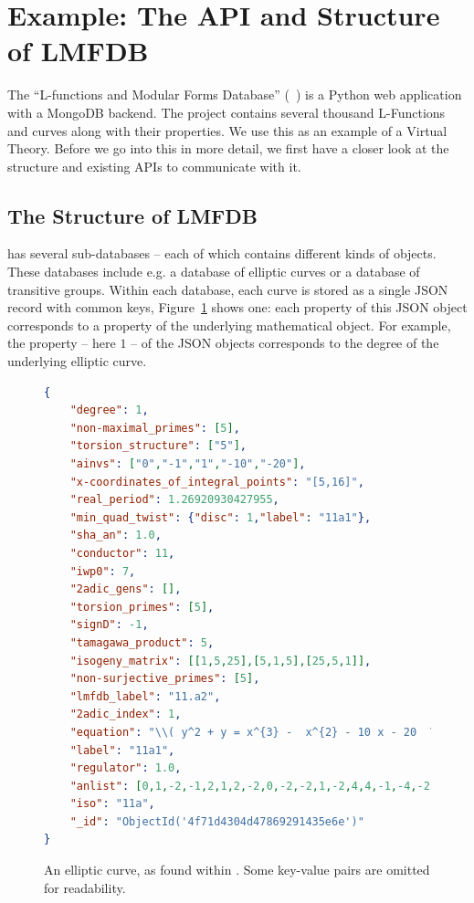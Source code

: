\section{Example: The API and Structure of LMFDB}\label{sec:sota}

The ``L-functions and Modular Forms Database'' (\lmfdb~\cite{lmfdb}) is a Python web
application with a MongoDB backend.  The project contains several thousand L-Functions and
curves along with their properties. We use this as an example of a Virtual Theory.  Before
we go into this in more detail, we first have a closer look at the structure and existing
APIs to communicate with it.

\subsection{The Structure of LMFDB}\label{sec:sota:struct}

\lmfdb has several sub-databases -- each of which contains different kinds of objects.
These databases include e.g. a database of elliptic curves or a database of transitive
groups.  Within each database, each curve is stored as a single JSON record with common
keys, Figure~\ref{fig:lmfdbexample} shows one: each property of this JSON object corresponds to a property of the underlying mathematical object. 
For example, the  property -- here $1$ -- of the JSON objects corresponds to the degree of the underlying elliptic curve. 


\begin{figure}[h]\centering
      \begin{lstlisting}[language=json]
{
    "degree": 1,
    "non-maximal_primes": [5],
    "torsion_structure": ["5"],
    "ainvs": ["0","-1","1","-10","-20"],
    "x-coordinates_of_integral_points": "[5,16]",
    "real_period": 1.26920930427955,
    "min_quad_twist": {"disc": 1,"label": "11a1"},
    "sha_an": 1.0,
    "conductor": 11,
    "iwp0": 7,
    "2adic_gens": [],
    "torsion_primes": [5],
    "signD": -1,
    "tamagawa_product": 5,
    "isogeny_matrix": [[1,5,25],[5,1,5],[25,5,1]],
    "non-surjective_primes": [5],
    "lmfdb_label": "11.a2",
    "2adic_index": 1,
    "equation": "\\( y^2 + y = x^{3} -  x^{2} - 10 x - 20  \\)",
    "label": "11a1",
    "regulator": 1.0,
    "anlist": [0,1,-2,-1,2,1,2,-2,0,-2,-2,1,-2,4,4,-1,-4,-2,4,0,2],
    "iso": "11a",
    "_id": "ObjectId('4f71d4304d47869291435e6e')"
}
      \end{lstlisting}\vspace*{-1.5em}
  \caption[An elliptic curve from \lmfdb]{
    An elliptic curve, as found within \lmfdb. 
    Some key-value pairs are omitted for readability. 
  }
  \label{fig:lmfdbexample}
\end{figure}

